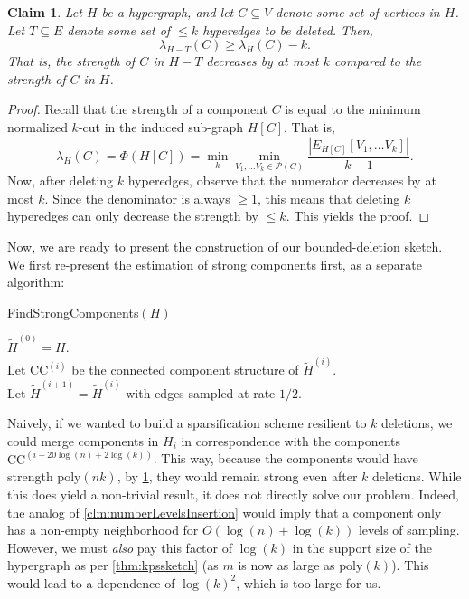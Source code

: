 \documentclass[11pt]{article}
\newtheorem{claim}[theorem]{Claim}
\theoremstyle{definition}
\begin{document}
\begin{claim}\label{clm:deleteStrength}
	Let $H$ be a hypergraph, and let $C \subseteq V$ denote some set of vertices in $H$. Let $T \subseteq E$ denote some set of $\leq k$ hyperedges to be deleted. Then,
	\[
	\lambda_{H-T}(C) \geq \lambda_H(C) - k.
	\]
	That is, the strength of $C$ in $H-T$ decreases by at most $k$ compared to the strength of $C$ in $H$.
\end{claim}

\begin{proof}
Recall that the strength of a component $C$ is equal to the minimum normalized $k$-cut in the induced sub-graph $H[C]$. That is,
\[
\lambda_H(C) = \Phi(H[C]) = \min_{k} \min_{V_1, \dots V_k \in \mathcal{P}(C)} \frac{|E_{H[C]}[V_1, \dots V_k]|}{k-1}.
\]
Now, after deleting $k$ hyperedges, observe that the numerator decreases by at most $k$. Since the denominator is always $\geq 1$, this means that deleting $k$ hyperedges can only decrease the strength by $\leq k$. This yields the proof. 
\end{proof}

Now, we are ready to present the construction of our bounded-deletion sketch. We first re-present the estimation of strong components first, as a separate algorithm:

\begin{algorithm}[H]
	\caption{FindStrongComponents$(H)$}\label{alg:findStrongCompBounded}
	$\widetilde{H}^{(0)} = H$. \\
	{
		Let $\mathrm{CC}^{(i)}$ be the connected component structure of $\widetilde{H}^{(i)}$. \\
		Let $\widetilde{H}^{(i+1)} = \widetilde{H}^{(i)}$ with edges sampled at rate $1/2$. \\
	}
\end{algorithm}

Naively, if we wanted to build a sparsification scheme resilient to $k$ deletions, we could merge components in $H_i$ in correspondence with the components $\mathrm{CC}^{(i + 20 \log(n) + 2 \log(k))}$. This way, because the components would have strength $\mathrm{poly}(nk)$, by \cref{clm:deleteStrength}, they would remain strong even after $k$ deletions. While this does yield a non-trivial result, it does not directly solve our problem. Indeed, the analog of \cref{clm:numberLevelsInsertion} would imply that a component only has a non-empty neighborhood for $O(\log(n) + \log(k))$ levels of sampling. However, we must \emph{also} pay this factor of $\log(k)$ in the support size of the hypergraph as per \cref{thm:kpssketch} (as $m$ is now as large as $\mathrm{poly}(k)$). This would lead to a dependence of $\log(k)^2$, which is too large for us. 
\end{document}

